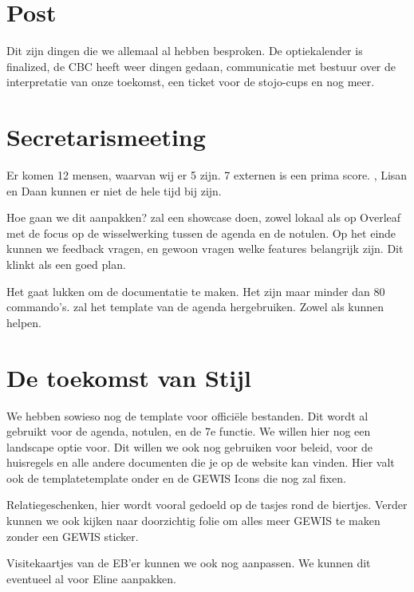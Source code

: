 \documentclass[
dutch
]{GEWISMinutes}
\begin{document}
	\section{Post}
	Dit zijn dingen die we allemaal al hebben besproken. De optiekalender is finalized, de CBC heeft weer dingen gedaan, communicatie met bestuur over de interpretatie van onze toekomst, een ticket voor de stojo-cups en nog meer.
	
	
	\section{Secretarismeeting}
	
	Er komen 12 mensen, waarvan wij er 5 zijn. 7 externen is een prima score. \nicky, Lisan en Daan kunnen er niet de hele tijd bij zijn.
	
	Hoe gaan we dit aanpakken? \gijs zal een showcase doen, zowel lokaal als op Overleaf met de focus op de wisselwerking tussen de agenda en de notulen. Op het einde kunnen we feedback vragen, en gewoon vragen welke features belangrijk zijn. Dit klinkt als een goed plan.
	
	Het gaat \gijs lukken om de documentatie te maken. Het zijn maar minder dan 80 commando's. \gijs zal het template van de agenda hergebruiken. Zowel \rink als \sanne kunnen helpen.
	
	\section{De toekomst van Stijl}
	We hebben sowieso nog de template voor offici\"ele bestanden.
	Dit wordt al gebruikt voor de agenda, notulen, en de 7e functie. We willen hier nog een landscape optie voor. Dit willen we ook nog gebruiken voor beleid, voor de huisregels en alle andere documenten die je op de website kan vinden. Hier valt ook de templatetemplate onder en de GEWIS Icons die \rink nog zal fixen.
	
	Relatiegeschenken, hier wordt vooral gedoeld op de tasjes rond de biertjes. Verder kunnen we ook kijken naar doorzichtig folie om alles meer GEWIS te maken zonder een GEWIS sticker.
	
	Visitekaartjes van de EB'er kunnen we ook nog aanpassen. We kunnen dit eventueel al voor Eline aanpakken.
	
\end{document}
